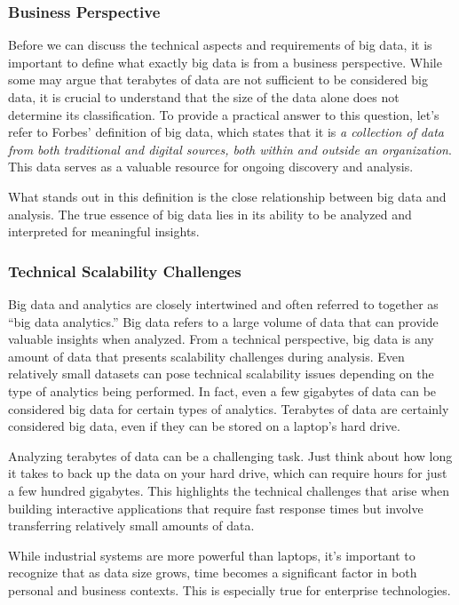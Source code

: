 \subsubsection{Business Perspective}

Before we can discuss the technical aspects and requirements of big
data, it is important to define what exactly big data is from a business
perspective. While some may argue that terabytes of data are not
sufficient to be considered big data, it is crucial to understand that
the size of the data alone does not determine its classification. To
provide a practical answer to this question, let's refer to Forbes'
definition of big data, which states that it is \textit{a collection of data
  from both traditional and digital sources, both within and outside an
  organization}. This data serves as a valuable resource for ongoing
discovery and analysis.

What stands out in this definition is the close relationship between big
data and analysis. The true essence of big data lies in its ability to
be analyzed and interpreted for meaningful insights.

\subsubsection{Technical Scalability Challenges}

Big data and analytics are closely intertwined and often referred to
together as ``big data analytics.'' Big data refers to a large volume of
data that can provide valuable insights when analyzed. From a technical
perspective, big data is any amount of data that presents scalability
challenges during analysis. Even relatively small datasets can pose
technical scalability issues depending on the type of analytics being
performed. In fact, even a few gigabytes of data can be considered big
data for certain types of analytics. Terabytes of data are certainly
considered big data, even if they can be stored on a laptop's hard
drive.

Analyzing terabytes of data can be a challenging task. Just think about
how long it takes to back up the data on your hard drive, which can
require hours for just a few hundred gigabytes. This highlights the
technical challenges that arise when building interactive applications
that require fast response times but involve transferring relatively
small amounts of data.

While industrial systems are more powerful than laptops, it's important
to recognize that as data size grows, time becomes a significant factor
in both personal and business contexts. This is especially true for
enterprise technologies.

